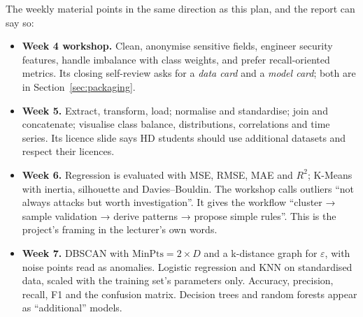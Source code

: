 The weekly material points in the same direction as this plan, and the report can say so:
\begin{itemize}
  \item \textbf{Week 4 workshop.} Clean, anonymise sensitive fields, engineer security features,
    handle imbalance with class weights, and prefer recall-oriented metrics. Its closing
    self-review asks for a \emph{data card} and a \emph{model card}; both are in
    Section~\ref{sec:packaging}.
  \item \textbf{Week 5.} Extract, transform, load; normalise and standardise; join and
    concatenate; visualise class balance, distributions, correlations and time series. Its
    licence slide says HD students should use additional datasets and respect their licences.
  \item \textbf{Week 6.} Regression is evaluated with MSE, RMSE, MAE and $R^2$; K-Means with
    inertia, silhouette and Davies--Bouldin. The workshop calls outliers ``not always attacks but
    worth investigation''. It gives the workflow ``cluster → sample validation → derive patterns
    → propose simple rules''. This is the project's framing in the lecturer's own words.
  \item \textbf{Week 7.} DBSCAN with $\text{MinPts}=2\times D$ and a k-distance graph for
    $\varepsilon$, with noise points read as anomalies. Logistic regression and KNN on
    standardised data, scaled with the training set's parameters only. Accuracy, precision,
    recall, F1 and the confusion matrix. Decision trees and random forests appear as
    ``additional'' models.
\end{itemize}
